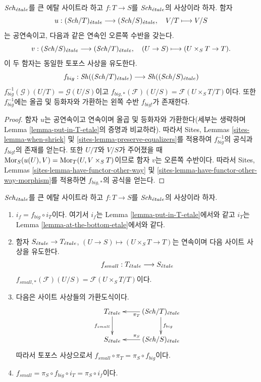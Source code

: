 \begin{lemma}
\label{lemma-morphism-big-etale}
$\mathit{Sch}_{\acute{e}tale}$를 큰 에탈 사이트라 하고
$f : T \to S$를 $\mathit{Sch}_{\acute{e}tale}$의 사상이라 하자. 함자
$$
u :
(\mathit{Sch}/T)_{\acute{e}tale}
\longrightarrow
(\mathit{Sch}/S)_{\acute{e}tale},
\quad
V/T \longmapsto V/S
$$
는 공연속이고, 다음과 같은 연속인 오른쪽 수반을 갖는다.
$$
v :
(\mathit{Sch}/S)_{\acute{e}tale}
\longrightarrow
(\mathit{Sch}/T)_{\acute{e}tale},
\quad
(U \to S) \longmapsto (U \times_S T \to T).
$$
이 두 함자는 동일한 토포스 사상을 유도한다.
$$
f_{big} :
\mathop{\mathit{Sh}}\nolimits((\mathit{Sch}/T)_{\acute{e}tale})
\longrightarrow
\mathop{\mathit{Sh}}\nolimits((\mathit{Sch}/S)_{\acute{e}tale})
$$
$f_{big}^{-1}(\mathcal{G})(U/T) = \mathcal{G}(U/S)$이고
$f_{big, *}(\mathcal{F})(U/S) = \mathcal{F}(U \times_S T/T)$이다.
또한 $f_{big}^{-1}$에는 올곱 및 등화자와 가환하는 왼쪽 수반
$f_{big!}$가 존재한다.
\end{lemma}

\begin{proof}
함자 $u$는 공연속이고 연속이며 올곱 및 등화자와 가환한다(세부는
생략하며 Lemma \ref{lemma-put-in-T-etale}의 증명과 비교하라). 따라서
Sites, Lemmas \ref{sites-lemma-when-shriek} 및
\ref{sites-lemma-preserve-equalizers}를 적용하여 $f_{big}^{-1}$의 공식과
$f_{big!}$의 존재를 얻는다. 또한 $U/T$와 $V/S$가 주어졌을 때
$\mathop{\mathrm{Mor}}\nolimits_S(u(U), V) = \mathop{\mathrm{Mor}}\nolimits_T(U, V \times_S T)$이므로 함자 $v$는 오른쪽
수반이다. 따라서 Sites, Lemmas
\ref{sites-lemma-have-functor-other-way} 및
\ref{sites-lemma-have-functor-other-way-morphism}를 적용하면
$f_{big, *}$의 공식을 얻는다.
\end{proof}

\begin{lemma}
\label{lemma-morphism-big-small-etale}
$\mathit{Sch}_{\acute{e}tale}$를 큰 에탈 사이트라 하고
$f : T \to S$를 $\mathit{Sch}_{\acute{e}tale}$의 사상이라 하자.
\begin{enumerate}
\item $i_f = f_{big} \circ i_T$이다. 여기서 $i_f$는 Lemma
\ref{lemma-put-in-T-etale}에서와 같고 $i_T$는 Lemma
\ref{lemma-at-the-bottom-etale}에서와 같다.
\item 함자 $S_{\acute{e}tale} \to T_{\acute{e}tale}$,
$(U \to S) \mapsto (U \times_S T \to T)$는 연속이며 다음 사이트
사상을 유도한다.
$$
f_{small} : T_{\acute{e}tale} \longrightarrow S_{\acute{e}tale}
$$
$f_{small, *}(\mathcal{F})(U/S) = \mathcal{F}(U \times_S T/T)$이다.
\item 다음은 사이트 사상들의 가환도식이다.
$$
\xymatrix{
T_\etale \ar[d]_{f_{small}} &
(\Sch/T)_\etale \ar[d]^{f_{big}} \ar[l]^{\pi_T}\\
S_\etale &
(\Sch/S)_\etale \ar[l]_{\pi_S}
}
$$
따라서 토포스 사상으로서
$f_{small} \circ \pi_T = \pi_S \circ f_{big}$이다.
\item $f_{small} = \pi_S \circ f_{big} \circ i_T = \pi_S \circ i_f$이다.
\end{enumerate}
\end{lemma}

